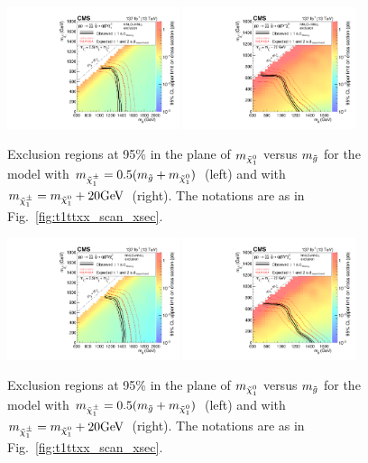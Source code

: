 \begin{figure}[!hbtp]
\centering
\includegraphics[width=0.45\textwidth]{figs/ssp/scan_t5qqqqvv.pdf}
\includegraphics[width=0.45\textwidth]{figs/ssp/scan_t5qqqqvvdm20.pdf}
\caption{Exclusion regions at 95\% \CL in the plane of $m_{\tilde{\chi}_1^0}$ versus $m_{\tilde{g}}$ for the \TfqqqqWZ model
with $m_{\tilde{\chi}_1^{\pm}}=0.5(m_{\tilde{g}} + m_{\tilde{\chi}_1^0})$~(left) and with $m_{\tilde{\chi}_1^{\pm}} = m_{\tilde{\chi}_1^0} + 20\text{GeV}$~(right).
The notations are as in Fig.~\ref{fig:t1ttxx_scan_xsec}.  }
\label{fig:t5qqqqvv_scan_xsec}
\end{figure}

\begin{figure}[!hbtp]
\centering
\includegraphics[width=0.45\textwidth]{figs/ssp/scan_t5qqqqww.pdf}
\includegraphics[width=0.45\textwidth]{figs/ssp/scan_t5qqqqwwdm20.pdf}
\caption{Exclusion regions at 95\% \CL in the plane of $m_{\tilde{\chi}_1^0}$ versus $m_{\tilde{g}}$ for the \TfqqqqWW model
with $m_{\tilde{\chi}_1^{\pm}}=0.5(m_{\tilde{g}} + m_{\tilde{\chi}_1^0})$~(left) and with $m_{\tilde{\chi}_1^{\pm}} = m_{\tilde{\chi}_1^0} + 20\text{GeV}$~(right).
The notations are as in Fig.~\ref{fig:t1ttxx_scan_xsec}.  }
\label{fig:t5qqqqww_scan_xsec}
\end{figure}




